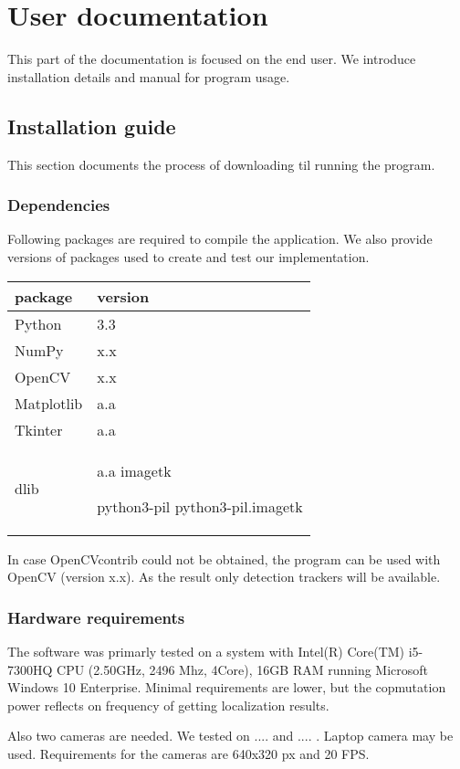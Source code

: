 \chapter{User documentation}
This part of the documentation is focused on the end user. We introduce
installation details and manual for program usage.

\section{Installation guide}
This section documents the process of downloading til running the program.

\subsection{Dependencies}
Following packages are required to compile the application. We also provide
versions of packages used to create and test our implementation.

\begin{center}
\begin{tabular}{l l}
	package	&	version \\ \hline
	Python	&	3.3 \\
	NumPy	&	x.x \\
	OpenCV	&	x.x \\ 
	Matplotlib &	a.a \\
	Tkinter	&	a.a \\
	dlib	&	a.a
	imagetk

	 python3-pil python3-pil.imagetk
\end{tabular}
\end{center}

In case OpenCVcontrib could not be obtained, the program can be used with
OpenCV (version x.x). As the result only detection trackers will be available.

\subsection{Hardware requirements}
The software was primarly tested on a system with Intel(R) Core(TM) i5-7300HQ
CPU (2.50GHz, 2496 Mhz, 4Core), 16GB RAM running Microsoft Windows 10
Enterprise. Minimal requirements are lower, but the copmutation power reflects
on frequency of getting localization results.

Also two cameras are needed. We tested on .... and .... . Laptop camera may be
used. Requirements for the cameras are 640x320 px and 20 FPS.

